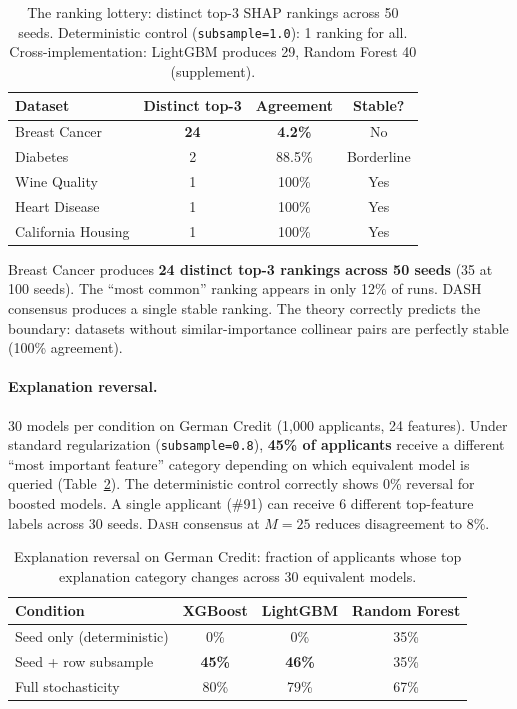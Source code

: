 \documentclass{article}
\newcommand{\DASH}{\textsc{Dash}}
\begin{document}
\begin{table}[t]
\centering
\caption{The ranking lottery: distinct top-3 SHAP rankings across 50 seeds. Deterministic control (\texttt{subsample=1.0}): 1 ranking for all. Cross-implementation: LightGBM produces 29, Random Forest 40 (supplement).}
\label{tab:ranking-lottery}
\small
\begin{tabular}{@{}lccc@{}}
\toprule
Dataset & Distinct top-3 & Agreement & Stable? \\
\midrule
Breast Cancer & \textbf{24} & \textbf{4.2\%} & No \\
Diabetes & 2 & 88.5\% & Borderline \\
Wine Quality & 1 & 100\% & Yes \\
Heart Disease & 1 & 100\% & Yes \\
California Housing & 1 & 100\% & Yes \\
\bottomrule
\end{tabular}
\end{table}

Breast Cancer produces \textbf{24 distinct top-3 rankings across 50 seeds} (35 at 100 seeds). The ``most common'' ranking appears in only 12\% of runs. DASH consensus produces a single stable ranking. The theory correctly predicts the boundary: datasets without similar-importance collinear pairs are perfectly stable (100\% agreement).

\paragraph{Explanation reversal.}
30 models per condition on German Credit (1,000 applicants, 24 features). Under standard regularization (\texttt{subsample=0.8}), \textbf{45\% of applicants} receive a different ``most important feature'' category depending on which equivalent model is queried (Table~\ref{tab:clinical}). The deterministic control correctly shows 0\% reversal for boosted models. A single applicant (\#91) can receive 6 different top-feature labels across 30 seeds. \DASH{} consensus at $M=25$ reduces disagreement to 8\%.

\begin{table}[t]
\centering
\caption{Explanation reversal on German Credit: fraction of applicants whose top explanation category changes across 30 equivalent models.}
\label{tab:clinical}
\small
\begin{tabular}{@{}lccc@{}}
\toprule
Condition & XGBoost & LightGBM & Random Forest \\
\midrule
Seed only (deterministic) & 0\% & 0\% & 35\% \\
Seed + row subsample & \textbf{45\%} & \textbf{46\%} & 35\% \\
Full stochasticity & 80\% & 79\% & 67\% \\
\bottomrule
\end{tabular}
\end{table}
\end{document}
